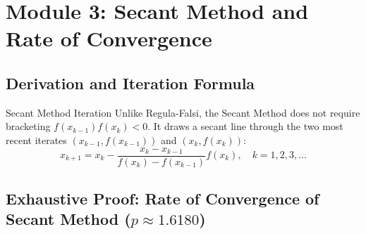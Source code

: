 \documentclass[11pt,a4paper]{article}
\begin{document}
\newpage

\section{Module 3: Secant Method and Rate of Convergence}

\subsection{Derivation and Iteration Formula}

\begin{center}
\end{center}

\begin{defbox}{Secant Method Iteration}
Unlike Regula-Falsi, the Secant Method does not require bracketing $f(x_{k-1})f(x_k) < 0$. It draws a secant line through the two most recent iterates $(x_{k-1}, f(x_{k-1}))$ and $(x_k, f(x_k))$:
\begin{equation}
    x_{k+1} = x_k - \frac{x_k - x_{k-1}}{f(x_k) - f(x_{k-1})} f(x_k), \quad k = 1, 2, 3, \dots
\end{equation}
\end{defbox}

\subsection{\texorpdfstring{Exhaustive Proof: Rate of Convergence of Secant Method ($p \approx 1.6180$)}{Exhaustive Proof: Rate of Convergence of Secant Method (p = 1.6180)}}
\end{document}
